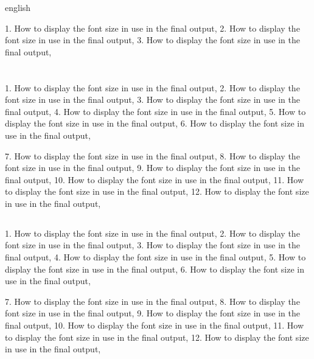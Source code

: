 \begin{otherlanguage*}{english}

    \showfont

    1. How to display the font size in use in the final output,
    2. How to display the font size in use in the final output,
    3. How to display the font size in use in the final output,


    \section[Some encoding tests]{\showfont}

    1. How to display the font size in use in the final output,
    2. How to display the font size in use in the final output,
    3. How to display the font size in use in the final output,
    4. How to display the font size in use in the final output,
    5. How to display the font size in use in the final output,
    6. How to display the font size in use in the final output,

    7. How to display the font size in use in the final output,
    8. How to display the font size in use in the final output,
    9. How to display the font size in use in the final output,
    10. How to display the font size in use in the final output,
    11. How to display the font size in use in the final output,
    12. How to display the font size in use in the final output,

    \subsection{\showfont}

    1. How to display the font size in use in the final output,
    2. How to display the font size in use in the final output,
    3. How to display the font size in use in the final output,
    4. How to display the font size in use in the final output,
    5. How to display the font size in use in the final output,
    6. How to display the font size in use in the final output,

    7. How to display the font size in use in the final output,
    8. How to display the font size in use in the final output,
    9. How to display the font size in use in the final output,
    10. How to display the font size in use in the final output,
    11. How to display the font size in use in the final output,
    12. How to display the font size in use in the final output,


\end{otherlanguage*}
